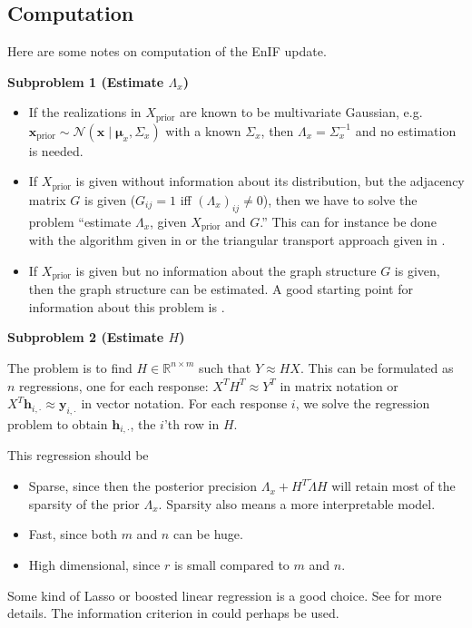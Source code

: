 \documentclass[12pt, a4paper]{article}
\theoremstyle{spaced}
\theoremstyle{spaceddef}
\numberwithin{equation}{section}
\begin{document}
\subsection{Computation}
Here are some notes on computation of the EnIF update.

\textbf{Subproblem 1 (Estimate $\Lambda_x$)}
\begin{itemize}
    \item If the realizations in $X_\text{prior}$ are known to be multivariate Gaussian, e.g. $\bm{x}_\text{prior} \sim \mathcal{N}\left( \bm{x} \mid \bm{\mu}_x, \Sigma_x \right)$ with a known $\Sigma_x$, then $\Lambda_x = \Sigma_x^{-1}$ and no estimation is needed. %
    \item If $X_\text{prior}$ is given without information about its distribution, but the adjacency matrix $G$ is given ($G_{ij} = 1$ iff $(\Lambda_x)_{ij} \neq 0$), then we have to solve the problem ``estimate $\Lambda_x$, given $X_\text{prior}$ and $G$.''
    This can for instance be done with the algorithm given in \citet[Chapter~17.3.1]{hastie2009elements} or the triangular transport approach given in \citet*{lunde2025ensemble}.
    \item If $X_\text{prior}$ is given but no information about the graph structure $G$ is given, then the graph structure can be estimated.
    A good starting point for information about this problem is \citet[Chapter~17.3.2]{hastie2009elements}.
\end{itemize}

\textbf{Subproblem 2 (Estimate $H$)}

The problem is to find $H \in \mathbb{R}^{n \times m}$ such that $Y \approx H X$.
This can be formulated as $n$ regressions, one for each response: $X^T H^T \approx Y^T$ in matrix notation or $X^T \bm{h}_{i, \cdot} \approx \bm{y}_{i, \cdot}$ in vector notation.
For each response $i$, we solve the regression problem to obtain $\bm{h}_{i, \cdot}$, the $i$'th row in $H$.

This regression should be
\begin{itemize}
    \item Sparse, since then the posterior precision $\Lambda_x + H^T \tilde{\Lambda} H$ will retain most of the sparsity of the prior $\Lambda_x$.
    Sparsity also means a more interpretable model.
    \item Fast, since both $m$ and $n$ can be huge.
    \item High dimensional, since $r$ is small compared to $m$ and $n$.
\end{itemize}
Some kind of Lasso or boosted linear regression is a good choice.
See \citet[Appendix~E]{lunde2025ensemble} for more details.
The information criterion in \citet{boosting2006buhlman} could perhaps be used.
\end{document}
